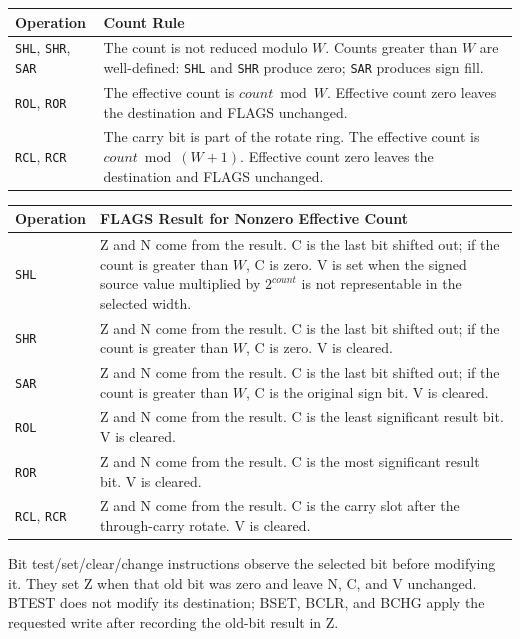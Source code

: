 \begingroup\footnotesize
\begin{longtable}{@{}p{1.25in}p{4.15in}@{}}
\toprule
\textbf{Operation} & \textbf{Count Rule}\\
\midrule
\endhead
\texttt{SHL}, \texttt{SHR}, \texttt{SAR} & The count is not reduced modulo \(W\). Counts greater than \(W\) are well-defined: \texttt{SHL} and \texttt{SHR} produce zero; \texttt{SAR} produces sign fill.\\
\texttt{ROL}, \texttt{ROR} & The effective count is \(\mathit{count} \bmod W\). Effective count zero leaves the destination and FLAGS unchanged.\\
\texttt{RCL}, \texttt{RCR} & The carry bit is part of the rotate ring. The effective count is \(\mathit{count} \bmod (W + 1)\). Effective count zero leaves the destination and FLAGS unchanged.\\
\bottomrule
\end{longtable}
\endgroup

\begingroup\footnotesize
\begin{longtable}{@{}p{0.75in}p{4.65in}@{}}
\toprule
\textbf{Operation} & \textbf{FLAGS Result for Nonzero Effective Count}\\
\midrule
\endhead
\texttt{SHL} & Z and N come from the result. C is the last bit shifted out; if the count is greater than \(W\), C is zero. V is set when the signed source value multiplied by \(2^{count}\) is not representable in the selected width.\\
\texttt{SHR} & Z and N come from the result. C is the last bit shifted out; if the count is greater than \(W\), C is zero. V is cleared.\\
\texttt{SAR} & Z and N come from the result. C is the last bit shifted out; if the count is greater than \(W\), C is the original sign bit. V is cleared.\\
\texttt{ROL} & Z and N come from the result. C is the least significant result bit. V is cleared.\\
\texttt{ROR} & Z and N come from the result. C is the most significant result bit. V is cleared.\\
\texttt{RCL}, \texttt{RCR} & Z and N come from the result. C is the carry slot after the through-carry rotate. V is cleared.\\
\bottomrule
\end{longtable}
\endgroup

Bit test/set/clear/change instructions observe the selected bit before modifying it. They set
Z when that old bit was zero and leave N, C, and V unchanged. BTEST does not modify its
destination; BSET, BCLR, and BCHG apply the requested write after recording the old-bit result
in Z.

